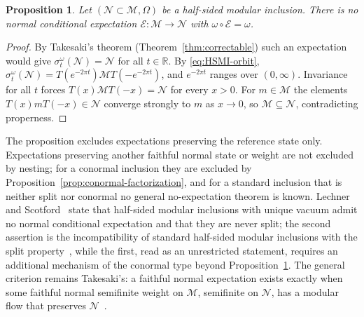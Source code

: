 \documentclass[a4paper,11pt]{article}
\newtheorem{proposition}[theorem]{Proposition}
\theoremstyle{definition}
\newcommand{\mE}{\mathcal{E}}
\begin{document}
\begin{proposition}\label{prop:no-vacuum-expectation}
Let $(\mathcal N\subset\mathcal M,\Omega)$ be a half-sided modular inclusion. There is no normal conditional expectation $\mE:\mathcal M\to\mathcal N$ with $\omega\circ\mE=\omega$.
\end{proposition}

\begin{proof}
By Takesaki's theorem (Theorem~\ref{thm:correctable}) such an expectation would give $\sigma^{\omega}_t(\mathcal N)=\mathcal N$ for all $t\in\mathbb R$. By \eqref{eq:HSMI-orbit}, $\sigma^\omega_t(\mathcal N)=T(e^{-2\pi t})\mathcal MT(-e^{-2\pi t})$, and $e^{-2\pi t}$ ranges over $(0,\infty)$. Invariance for all $t$ forces $T(x)\mathcal MT(-x)=\mathcal N$ for every $x>0$. For $m\in\mathcal M$ the elements $T(x)mT(-x)\in\mathcal N$ converge strongly to $m$ as $x\to0$, so $\mathcal M\subseteq\mathcal N$, contradicting properness.
\end{proof}

The proposition excludes expectations preserving the reference state only. Expectations preserving another faithful normal state or weight are not excluded by nesting; for a conormal inclusion they are excluded by Proposition~\ref{prop:conormal-factorization}, and for a standard inclusion that is neither split nor conormal no general no-expectation theorem is known. Lechner and Scotford~\cite[Section~2]{LechnerScotford2022} state that half-sided modular inclusions with unique vacuum admit no normal conditional expectation and that they are never split; the second assertion is the incompatibility of standard half-sided modular inclusions with the split property~\cite{Wiesbrock1993}, while the first, read as an unrestricted statement, requires an additional mechanism of the conormal type beyond Proposition~\ref{prop:no-vacuum-expectation}. The general criterion remains Takesaki's: a faithful normal expectation exists exactly when some faithful normal semifinite weight on $\mathcal M$, semifinite on $\mathcal N$, has a modular flow that preserves $\mathcal N$~\cite{Takesaki1972}.
\end{document}
